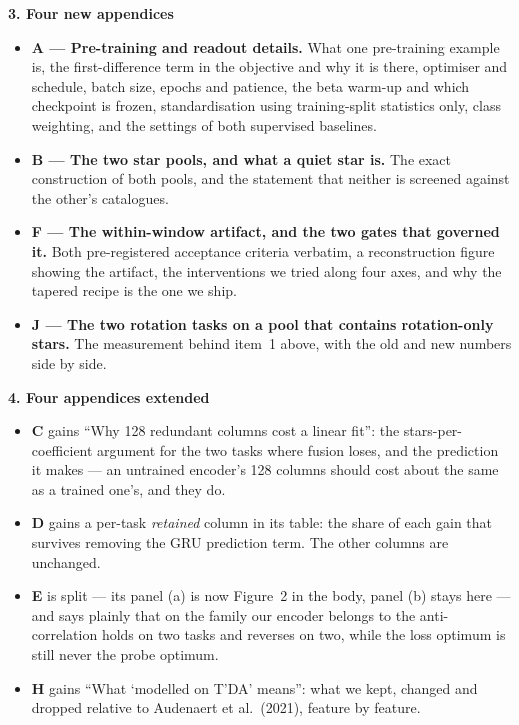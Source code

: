 \documentclass[10pt]{article}
\begin{document}
\newpage

\textbf{3. Four new appendices}

\begin{itemize}[leftmargin=*, itemsep=4pt]
\item \textbf{A --- Pre-training and readout details.} What one pre-training example is, the
first-difference term in the objective and why it is there, optimiser and schedule, batch size,
epochs and patience, the beta warm-up and which checkpoint is frozen, standardisation using
training-split statistics only, class weighting, and the settings of both supervised baselines.
\item \textbf{B --- The two star pools, and what a quiet star is.} The exact construction of both
pools, and the statement that neither is screened against the other's catalogues.
\item \textbf{F --- The within-window artifact, and the two gates that governed it.} Both
pre-registered acceptance criteria verbatim, a reconstruction figure showing the artifact, the
interventions we tried along four axes, and why the tapered recipe is the one we ship.
\item \textbf{J --- The two rotation tasks on a pool that contains rotation-only stars.} The
measurement behind item~1 above, with the old and new numbers side by side.
\end{itemize}

\textbf{4. Four appendices extended}

\begin{itemize}[leftmargin=*, itemsep=4pt]
\item \textbf{C} gains ``Why 128 redundant columns cost a linear fit'': the stars-per-coefficient
argument for the two tasks where fusion loses, and the prediction it makes --- an untrained encoder's
128 columns should cost about the same as a trained one's, and they do.
\item \textbf{D} gains a per-task \emph{retained} column in its table: the share of each gain that
survives removing the GRU prediction term. The other columns are unchanged.
\item \textbf{E} is split --- its panel (a) is now Figure~2 in the body, panel (b) stays here --- and
says plainly that on the family our encoder belongs to the anti-correlation holds on two tasks and
reverses on two, while the loss optimum is still never the probe optimum.
\item \textbf{H} gains ``What `modelled on T'DA' means'': what we kept, changed and dropped relative
to Audenaert et al.\ (2021), feature by feature.
\end{itemize}
\end{document}
